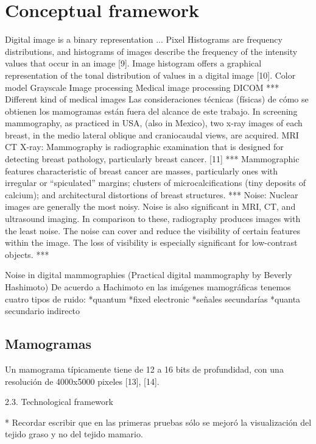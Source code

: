 \section{Conceptual framework}

Digital image is a binary representation ...
Pixel
Histograms are frequency distributions, and histograms of images describe the frequency of the intensity values that occur in an image [9]. Image histogram offers a graphical representation of the tonal distribution of values in a digital image [10].
Color model
Grayscale
Image processing
Medical image processing
DICOM
***
Different kind of medical images
Las consideraciones técnicas (físicas) de cómo se obtienen los mamogramas están fuera del alcance de este trabajo. In screening mammography, as practiced in USA, (also in Mexico), two x-ray images of each breast, in the medio lateral oblique and craniocaudal views, are acquired. 
MRI
CT
X-ray:
Mammography is radiographic examination that is designed for detecting breast pathology, particularly breast cancer. [11]
***
Mammographic features characteristic of breast cancer are masses, particularly ones with irregular or “spiculated” margins; clusters of microcalcifications (tiny deposits of calcium); and architectural distortions of breast structures. 
***
Noise: 
Nuclear images are generally the most noisy. Noise is also significant in MRI, CT, and ultrasound imaging. In comparison to these, radiography produces images with the least noise. 
The noise can cover and reduce the visibility of certain features within the image. The loss of visibility is especially significant for low-contrast objects.
***


Noise in digital mammographies (Practical digital mammography by Beverly Hashimoto)
De acuerdo a Hachimoto en las imágenes mamográficas tenemos cuatro tipos de ruido:
*quantum
*fixed electronic
*señales secundarías
*quanta secundario indirecto

\subsection{Mamogramas}

Un mamograma típicamente tiene de 12 a 16 bits de profundidad, con una
resolución de 4000x5000 pixeles [13], [14].  

2.3. Technological framework


* Recordar escribir que en las primeras pruebas sólo se mejoró  la visualización del tejido graso y no del tejido mamario.


